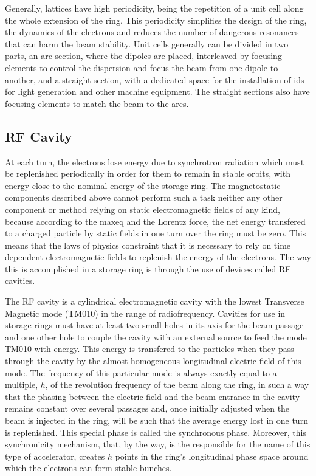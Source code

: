     Generally, lattices have high periodicity, being the repetition of a unit cell along the whole extension of the ring. This periodicity simplifies the design of the ring, the dynamics of the electrons and reduces the number of dangerous resonances that can harm the beam stability. Unit cells generally can be divided in two parts, an arc section, where the dipoles are placed, interleaved by focusing elements to control the dispersion and focus the beam from one dipole to another, and a straight section, with a dedicated space for the installation of \glspl{id} for light generation and other machine equipment. The straight sections also have focusing elements to match the beam to the arcs.

\subsection{RF Cavity}

    At each turn, the electrons lose energy due to synchrotron radiation which must be replenished periodically in order for them to remain in stable orbits, with energy close to the nominal energy of the storage ring. The magnetostatic components described above cannot perform such a task neither any other component or method relying on static electromagnetic fields of any kind, because according to the \gls{maxeq} and the Lorentz force, the net energy transfered to a charged particle by static fields in one turn over the ring must be zero. This means that the laws of physics constraint that it is necessary to rely on time dependent electromagnetic fields to replenish the energy of the electrons. The way this is accomplished in a storage ring is through the use of devices called RF cavities.

    The RF cavity is a cylindrical electromagnetic cavity with the lowest Transverse Magnetic mode (TM010) in the range of radiofrequency. Cavities for use in storage rings must have at least two small holes in its axis for the beam passage and one other hole to couple the cavity with an external source to feed the mode TM010 with energy. This energy is transfered to the particles when they pass through the cavity by the almost homogeneous longitudinal electric field of this mode. The frequency of this particular mode is always exactly equal to a multiple, $h$, of the revolution frequency of the beam along the ring, in such a way that the phasing between the electric field and the beam entrance in the cavity remains constant over several passages and, once initially adjusted when the beam is injected in the ring, will be such that the average energy lost in one turn is replenished. This special phase is called the synchronous phase. Moreover, this synchronicity mechanism, that, by the way, is the responsible for the name of this type of accelerator, creates $h$ points in the ring's longitudinal phase space around which the electrons can form stable bunches.

